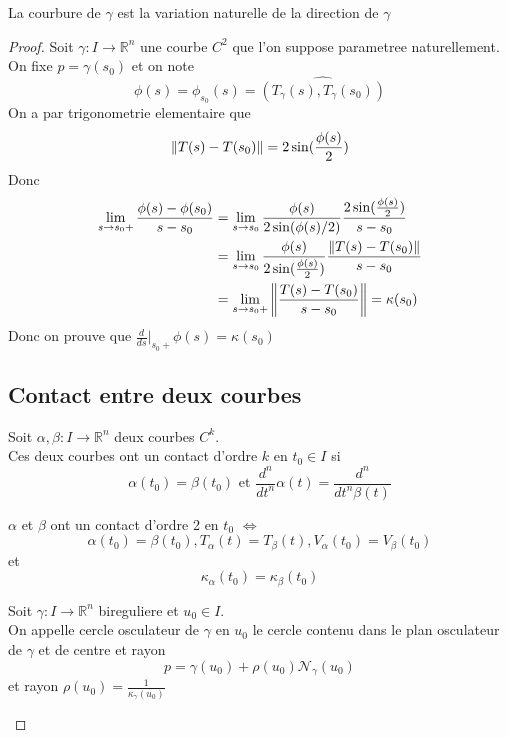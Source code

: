\documentclass[../main.tex]{subfiles}
\begin{document}
\begin{thm}
La courbure de $\gamma$ est la variation naturelle de la direction de $\gamma$ 
\end{thm}
\begin{proof}
Soit $\gamma: I \to \mathbb{R}^n$ une courbe $C^{2}$ que l'on suppose parametree naturellement.\\
On fixe $p= \gamma( s_0) $ et on note 
\[ 
	\phi( s) = \phi_{s_0} ( s) = \hat { ( T_{\gamma} ( s) ,T_{\gamma} ( s_0) )  }
\]
On a par trigonometrie elementaire que
\[ 
	\left\lVert T( s) -T( s_0) \right\rVert = 2 \sin ( \frac{\phi(s ) }{2}) 
\]
Donc
\begin{align*}
	\lim_{s \to s_0+} \frac{\phi( s) -\phi( s_0) }{s-s_0}&= \lim_{s \to s_0} \frac{\phi( s) }{2 \sin ( \phi( s) /2) } \frac{2 \sin( \frac{\phi( s) }{2}) }{s-s_0}\\
							     &= \lim_{s \to s_0} \frac{\phi( s) }{2 \sin( \frac{\phi( s) }{2}) } \frac{\left\lVert T( s) -T( s_0) \right\rVert }{s-s_0}\\
							     &= \lim_{s \to s_0 +} \left\lVert \frac{T( s) -T( s_0) }{s-s_0}\right\rVert 	= \kappa( s_0) 
\end{align*}
Donc on prouve que $\frac{d}{ds}\vert_{s_0+} \phi( s) =\kappa( s_0) $
\subsection{Contact entre deux courbes}
\begin{defn}
	Soit $\alpha,\beta: I \to \mathbb{R}^n$ deux courbes $C^{k}$.\\
	Ces deux courbes ont un contact d'ordre $k$ en $t_0\in I$ si
	\[ 
		\alpha( t_0) =\beta( t_0) \text{ et } \frac{d^{n}}{dt^{n}} \alpha( t) = \frac{d^{n}}{dt^{n}\beta( t) }
	\]
	
\end{defn}
\begin{thm}
$\alpha$ et $\beta$ ont un contact d'ordre 2 en $t_0$ $\iff$ 
\[ 
	\alpha( t_0) = \beta( t_0), T_{\alpha} ( t) = T_{\beta} ( t) , V_\alpha( t_0) = V_{\beta } ( t_0) 
\]
et
\[ 
	\kappa_{\alpha} ( t_0) = \kappa_\beta( t_0) 
\]
\end{thm}
\begin{defn}
	Soit $\gamma:I\to \mathbb{R}^n$ bireguliere et $u_0\in I$.\\
	On appelle cercle osculateur de $\gamma$ en $u_0$ le cercle contenu dans le plan osculateur de $\gamma$ et de centre et rayon
	\[ 
		p= \gamma( u_0) + \rho( u_0) \mathcal{N}_\gamma( u_0) 
	\]
	et rayon $\rho( u_0) = \frac{1}{\kappa_{\gamma} ( u_0) }$ 
	

\end{defn}
\end{proof}
\end{document}

